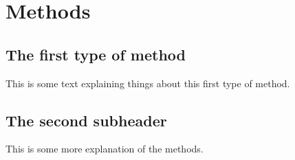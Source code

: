\section*{Methods}
\subsection*{The first type of method}
This is some text explaining things about this first type of method.

\subsection*{The second subheader}

This is some more explanation of the methods.